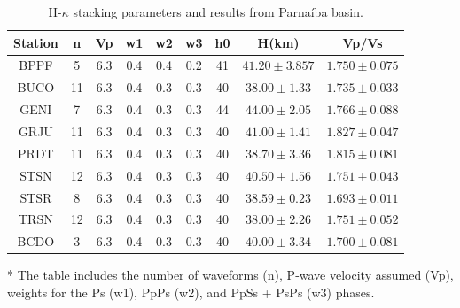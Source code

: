 \documentclass[paper,11pt]{geophysics}
\begin{document}
\begin{table}[! htpb]
\centering
	\small
	\begin{threeparttable}
	\caption{H-$\kappa$ stacking parameters and results from Parnaíba basin.}
	\begin{tabular}{c c c c c c c c c}
    \hline
    Station & n & Vp & w1 & w2 & w3 & h0 & H(km) & Vp/Vs \\ \hline		
    BPPF & 5 & 6.3 & 0.4 & 0.4 & 0.2 & 41 & $41.20 \pm3.857$ & $1.750 \pm  0.075$ \\
	BUCO & 11 & 6.3 & 0.4 & 0.3 & 0.3 & 40 & $38.00 \pm 1.33$ & $1.735 \pm 0.033$ \\
	GENI & 7 & 6.3 & 0.4 & 0.3 & 0.3 & 44 & $44.00 \pm 2.05$ & $1.766 \pm 0.088$ \\
	GRJU & 11 & 6.3 & 0.4 & 0.3 & 0.3 & 40 & $41.00 \pm 1.41$ & $1.827\pm 0.047$ \\
	PRDT & 11 & 6.3 & 0.4 & 0.3 & 0.3 & 40 & $38.70 \pm 3.36$ & $1.815 \pm 0.081$ \\
	STSN & 12 & 6.3 & 0.4 & 0.3 & 0.3 & 40 & $40.50 \pm 1.56$ & $1.751 \pm 0.043$ \\
	STSR & 8 & 6.3 & 0.4 & 0.3 & 0.3 & 40 & $38.59 \pm 0.23$ & $1.693 \pm 0.011$ \\
	TRSN & 12 & 6.3 & 0.4 & 0.3 & 0.3 & 40 & $38.00 \pm 2.26$ & $1.751 \pm 0.052$ \\
	BCDO & 3 & 6.3 & 0.4 & 0.3 & 0.3 & 40 & $40.00 \pm 3.34$ & $1.700 \pm 0.081$ \\ \hline
    \end{tabular}
	\begin{tablenotes}\footnotesize
	\item[*] The table includes the number of waveforms (n), P-wave velocity assumed (Vp), weights for the Ps (w1), PpPs (w2), and PpSs + PsPs (w3) phases.
    \end{tablenotes}
    \label{tabela_hk_stacking}
	\end{threeparttable}
\end{table}
\end{document}

